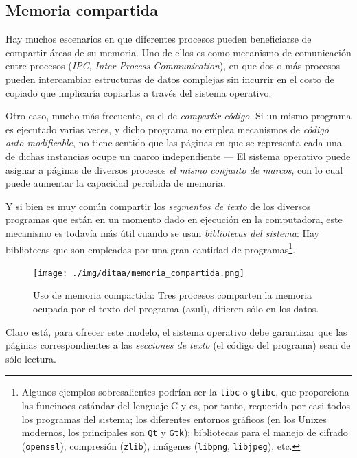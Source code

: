 \documentclass[11pt,fleqn]{book} %
\begin{document}
\subsection{Memoria compartida}
\label{sec-5-4-3}


Hay muchos escenarios en que diferentes procesos pueden beneficiarse
de compartir áreas de su memoria. Uno de ellos es como mecanismo de
comunicación entre procesos (\emph{IPC}, \emph{Inter Process Communication}),
en que dos o más procesos pueden intercambiar estructuras de datos
complejas sin incurrir en el costo de copiado que implicaría copiarlas
a través del sistema operativo. 

Otro caso, mucho más frecuente, es el de \emph{compartir código}. Si un 
mismo programa es ejecutado varias veces, y dicho programa no
emplea mecanismos de \emph{código auto-modificable}, no tiene sentido que
las páginas en que se representa cada una de dichas instancias ocupe
un marco independiente — El sistema operativo puede asignar a páginas
de diversos procesos \emph{el mismo conjunto de marcos}, con lo cual puede
aumentar la capacidad percibida de memoria.

Y si bien es muy común compartir los \emph{segmentos de texto} de los
diversos programas que están en un momento dado en ejecución en la
computadora, este mecanismo es todavía más útil cuando se usan
\emph{bibliotecas del sistema}: Hay bibliotecas que son empleadas por una
gran cantidad de programas\footnote{Algunos ejemplos sobresalientes
podrían ser la \texttt{libc} o \texttt{glibc}, que proporciona las funcinoes
estándar del lenguaje C y es, por tanto, requerida por casi todos los
programas del sistema; los diferentes entornos gráficos (en los Unixes
modernos, los principales son \texttt{Qt} y \texttt{Gtk}); bibliotecas para el
manejo de cifrado (\texttt{openssl}), compresión (\texttt{zlib}), imágenes
(\texttt{libpng}, \texttt{libjpeg}), etc. }.

\begin{figure}[htb]
\centering
\texttt{[image: ./img/ditaa/memoria\_compartida.png]}
\caption{\label{MEM_memoria_compartida}Uso de memoria compartida: Tres procesos comparten la memoria ocupada por el texto del programa (azul), difieren sólo en los datos.}
\end{figure}

Claro está, para ofrecer este modelo, el sistema operativo debe 
garantizar que las páginas correspondientes a las \emph{secciones de texto}
(el código del programa) sean de sólo lectura.
\end{document}
